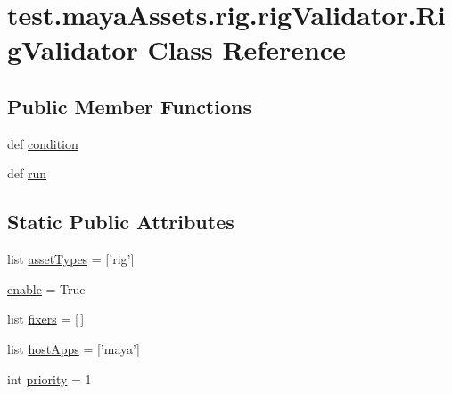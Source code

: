 \hypertarget{classtest_1_1mayaAssets_1_1rig_1_1rigValidator_1_1RigValidator}{\section{test.\-maya\-Assets.\-rig.\-rig\-Validator.\-Rig\-Validator \-Class \-Reference}
\label{d7/dc1/classtest_1_1mayaAssets_1_1rig_1_1rigValidator_1_1RigValidator}
}
\subsection*{\-Public \-Member \-Functions}
\begin{DoxyCompactItemize}
\item 
def \hyperlink{classtest_1_1mayaAssets_1_1rig_1_1rigValidator_1_1RigValidator_aa22c3eb8970c87e156111ba60b13bb5f}{condition}
\item 
def \hyperlink{classtest_1_1mayaAssets_1_1rig_1_1rigValidator_1_1RigValidator_a518874ccf6f6b9a1bceae05b6b3d5d82}{run}
\end{DoxyCompactItemize}
\subsection*{\-Static \-Public \-Attributes}
\begin{DoxyCompactItemize}
\item 
list \hyperlink{classtest_1_1mayaAssets_1_1rig_1_1rigValidator_1_1RigValidator_a8d3db014e7d03fcc61e7639354ccd5ab}{asset\-Types} = \mbox{[}'rig'\mbox{]}
\item 
\hyperlink{classtest_1_1mayaAssets_1_1rig_1_1rigValidator_1_1RigValidator_a76ec33aca7595e4abb5acd4a21d8783c}{enable} = \-True
\item 
list \hyperlink{classtest_1_1mayaAssets_1_1rig_1_1rigValidator_1_1RigValidator_aa2dd791d663b2d70fd23bf360a5c367f}{fixers} = \mbox{[}$\,$\mbox{]}
\item 
list \hyperlink{classtest_1_1mayaAssets_1_1rig_1_1rigValidator_1_1RigValidator_a7ddb87eb73c236c87a1d61b25b3777f6}{host\-Apps} = \mbox{[}'maya'\mbox{]}
\item 
int \hyperlink{classtest_1_1mayaAssets_1_1rig_1_1rigValidator_1_1RigValidator_ae959c6221277d03d035124c2f8aebcc7}{priority} = 1
\end{DoxyCompactItemize}


